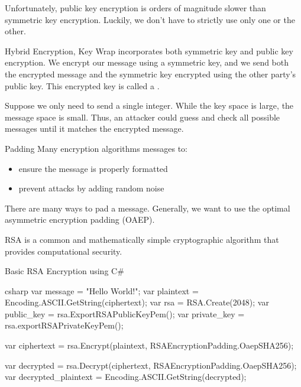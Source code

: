 \documentclass[12pt]{report}
\begin{document}
Unfortunately, public key encryption is orders of magnitude slower than symmetric key encryption. Luckily, we don't have to strictly use only one or the other.

\begin{dfnbox}{Hybrid Encryption, Key Wrap}{}
     incorporates both symmetric key and public key encryption. We encrypt our message using a symmetric key, and we send both the encrypted message and the symmetric key encrypted using the other party's public key. This encrypted key is called a .
\end{dfnbox}

Suppose we only need to send a single integer. While the key space is large, the message space is small. Thus, an attacker could guess and check all possible messages until it matches the encrypted message.

\begin{dfnbox}{Padding}{}
    Many encryption algorithms  messages to:
    \begin{itemize}[noitemsep]
        \item ensure the message is properly formatted
        \item prevent attacks by adding random noise
    \end{itemize}
\end{dfnbox}

There are many ways to pad a message. Generally, we want to use the optimal asymmetric encryption padding (OAEP).

\begin{dfnbox}{RSA}{}
     is a common and mathematically simple cryptographic algorithm that provides computational security.
\end{dfnbox}

\begin{codebox}{Basic RSA Encryption using C\#}{}{}
    \begin{amzcode}{csharp}
        var message = "Hello World!";
        var plaintext = Encoding.ASCII.GetString(ciphertext);
        var rsa = RSA.Create(2048);
        var public_key = rsa.ExportRSAPublicKeyPem();
        var private_key = rsa.exportRSAPrivateKeyPem();

        var ciphertext = rsa.Encrypt(plaintext, RSAEncryptionPadding.OaepSHA256);

        var decrypted = rsa.Decrypt(ciphertext, RSAEncryptionPadding.OaepSHA256);
        var decrypted_plaintext = Encoding.ASCII.GetString(decrypted);
    \end{amzcode}
\end{codebox}
\end{document}
